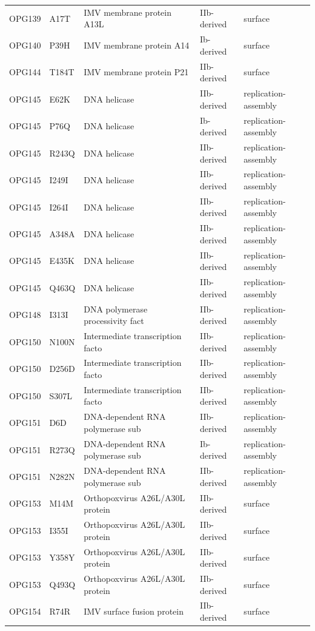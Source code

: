 \documentclass[11pt]{article}
\begin{document}
\begin{longtable}{lllll}
OPG139 & A17T & IMV membrane protein A13L & IIb-derived & surface \\
OPG140 & P39H & IMV membrane protein A14 & Ib-derived & surface \\
OPG144 & T184T & IMV membrane protein P21 & IIb-derived & surface \\
OPG145 & E62K & DNA helicase & IIb-derived & replication-assembly \\
OPG145 & P76Q & DNA helicase & Ib-derived & replication-assembly \\
OPG145 & R243Q & DNA helicase & IIb-derived & replication-assembly \\
OPG145 & I249I & DNA helicase & IIb-derived & replication-assembly \\
OPG145 & I264I & DNA helicase & IIb-derived & replication-assembly \\
OPG145 & A348A & DNA helicase & IIb-derived & replication-assembly \\
OPG145 & E435K & DNA helicase & IIb-derived & replication-assembly \\
OPG145 & Q463Q & DNA helicase & IIb-derived & replication-assembly \\
OPG148 & I313I & DNA polymerase processivity fact & IIb-derived & replication-assembly \\
OPG150 & N100N & Intermediate transcription facto & IIb-derived & replication-assembly \\
OPG150 & D256D & Intermediate transcription facto & IIb-derived & replication-assembly \\
OPG150 & S307L & Intermediate transcription facto & IIb-derived & replication-assembly \\
OPG151 & D6D & DNA-dependent RNA polymerase sub & IIb-derived & replication-assembly \\
OPG151 & R273Q & DNA-dependent RNA polymerase sub & Ib-derived & replication-assembly \\
OPG151 & N282N & DNA-dependent RNA polymerase sub & IIb-derived & replication-assembly \\
OPG153 & M14M & Orthopoxvirus A26L/A30L protein & IIb-derived & surface \\
OPG153 & I355I & Orthopoxvirus A26L/A30L protein & IIb-derived & surface \\
OPG153 & Y358Y & Orthopoxvirus A26L/A30L protein & IIb-derived & surface \\
OPG153 & Q493Q & Orthopoxvirus A26L/A30L protein & IIb-derived & surface \\
OPG154 & R74R & IMV surface fusion protein & IIb-derived & surface \\

\end{longtable}
\end{document}
